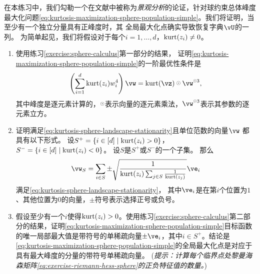 \documentclass[../../book-main_zh.tex]{subfiles}
\begin{document}
\begin{exercise}\label{exercise:kurtosis-sphere-landscape}
    在本练习中，我们勾勒一个在文献中被称为\textit{景观分析}的论证，针对球约束总体峰度最大化问题\eqref{eq:kurtosis-maximization-sphere-population-simple}。我们将证明，当至少有一个独立分量具有正峰度时，其
    全局最大化点确实导致恢复字典$\vU$的一列。
    为简单起见，我们将假设对于每个$i = 1, \dots, d$，$\mathop{\mathrm{kurt}}(z_i) \neq 0$。
    \begin{enumerate}
        \item 使用练习\ref{exercise:sphere-calculus}第一部分的结果，
        证明\eqref{eq:kurtosis-maximization-sphere-population-simple}的一阶最优性条件是
        \begin{equation}\label{eq:kurtosis-sphere-landscape-stationarity}
            \left(\sum_{i=1}^d \kurt(z_i) w_i^4 \right) 
            \vw = \kurt(\vz) \hada \vw^{\hada 3}, 
        \end{equation}
        其中峰度是逐元素计算的，$\hada$表示向量的逐元素乘法，$\vw^{\hada 3}$表示其参数的逐元素立方。
        \item 证明满足\eqref{eq:kurtosis-sphere-landscape-stationarity}且单位范数的向量$\vw$
        都具有以下形式。
        设$S^+ = \set{i \in [d] \given \kurt(z_i) > 0}$，
        $S^- = \set{i \in [d] \given \kurt(z_i) < 0}$。
        设$S$是$S^+$或$S^-$的一个子集。
        那么
        \begin{equation}\label{eq:kurtosis-sphere-landscape-cps}
            \vw_S = \sum_{i \in S} \pm \sqrt{\frac{1}{\kurt(z_i) \sum_{j \in S} \frac{1}{\kurt(z_j)}}} \ve_i
        \end{equation}
        满足\eqref{eq:kurtosis-sphere-landscape-stationarity}，
        其中$\ve_i$是在第$i$个位置为$1$、其他位置为$0$的向量，$\pm$符号表示选择正号或负号。
        \item 假设至少有一个$i$使得$\mathop{\mathrm{kurt}}(z_i) > 0$。使用练习\ref{exercise:sphere-calculus}第二部分的结果，证明\eqref{eq:kurtosis-maximization-sphere-population-simple}目标函数的唯一局部最大值是带符号的单稀疏向量$\pm \ve_i$，其中$i \in S^+$。结论是\eqref{eq:kurtosis-maximization-sphere-population-simple}的全局最大化点是对应于具有最大峰度的分量的带符号单稀疏向量。%
        (\textit{提示：计算每个临界点处黎曼海森矩阵\eqref{eq:exercise-riemann-hess-sphere}的正负特征值的数量。})

\end{enumerate}
\end{exercise}
\end{document}
